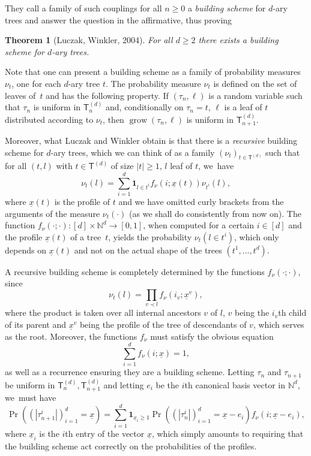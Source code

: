 \documentclass[JEP,XML,SOM,Unicode,NoFloatCountersInSection, NoEqCountersInSection,published]{cedram}
\newcommand{\sT}{\mathsf{T}}
\newcommand{\grow}{\operatorname{grow}}
\newtheorem{thm}{Theorem}[section]
\theoremstyle{definition}
\begin{document}
They call a family of such couplings for all $n\geq 0$ a \emph{building scheme} for $d$-ary trees and answer the question in the affirmative, thus proving

\begin{thm}[Luczak, Winkler, 2004]\label{thm:building scheme existence}For all $d\geq 2$ there exists a building scheme for $d$-ary trees.
\end{thm}

Note that one can present a building scheme as a family of probability measures~$\nu_t$, one for each $d$-ary tree $t$. The probability measure $\nu_t$ is defined on the set of leaves of~$t$ and has the following property. If $(\tau_n,\ell)$ is a random variable such that $\tau_n$ is uniform in $\sT_n^{(d)}$ and, conditionally on $\tau_n=t$, $\ell$ is a leaf of $t$ distributed according to $\nu_t$, then $\grow(\tau_n, \ell)$ is uniform in $\sT^{(d)}_{n+1}$.

Moreover, what Luczak and Winkler obtain is that there is a \emph{recursive} building scheme for $d$-ary trees, which we can think of as a family $(\nu_t)_{t\in \sT^{(d)}}$ such that for all $(t,l)$ with $t\in \sT^{(d)}$ of size $|t|\geq 1$, $l$ leaf of $t$, we~have
\[
\nu_t(l)=\sum_{i=1}^d \mathbf{1}_{l\in t^i}f_\nu(i;\underline{x}(t))\nu_{t^i}(l),
\]
where $\underline{x}(t)$ is the profile of $t$ and we have omitted curly brackets from the arguments of the measure $\nu_t(\cdot)$ (as we shall do consistently from now on). The function $f_\nu(\cdot ;\cdot):[d]\times \mathbb{N}^d\to [0,1]$, when computed for a certain $i\in[d]$ and the profile $\underline{x}(t)$ of a tree~$t$, yields the probability $\nu_t(l\in t^i)$, which only depends on $\underline{x}(t)$ and not on the actual shape of the trees $(t^1,\ldots,t^d)$.

A recursive building scheme is completely determined by the functions $f_\nu(\cdot ; \cdot)$, since
\[
\nu_t(l)=\prod_{v\prec l}f_\nu(i_v;\underline{x}^v),
\]
where the product is taken over all internal ancestors $v$ of $l$, $v$ being the $i_v$th child of its parent and $\underline{x}^v$ being the profile of the tree of descendants of $v$, which serves as the root. Moreover, the functions $f_\nu$ must satisfy the obvious equation
\[
\sum_{i=1}^df_\nu(i;\underline{x})=1,
\]
as well as a recurrence ensuring they are a building scheme. Letting $\tau_n$ and $\tau_{n+1}$ be uniform in $\sT_n^{(d)}, \sT_{n+1}^{(d)}$ and letting $e_i$ be the $i$th canonical basis vector in $\mathbb{N}^d$, we~must have
\begin{equation}\label{eq:d-ary recursion}\Pr((|\tau_{n+1}^i|)_{i=1}^d=\underline{x})=\sum_{i=1}^d\mathbf{1}_{\underline{x}_i\geq 1}\Pr((|\tau_{n}^i|)_{i=1}^d=\underline{x}-e_i)f_\nu(i;\underline{x}-e_i),\end{equation}
where $\underline{x}_i$ is the $i$th entry of the vector $\underline{x}$, which simply amounts to requiring that the building scheme act correctly on the probabilities of the profiles.
\end{document}
